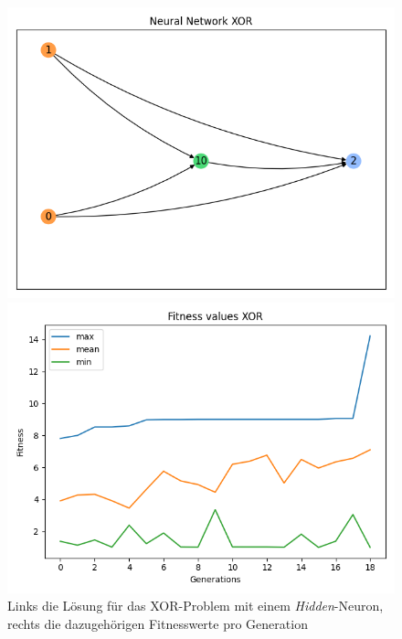 \begin{figure}[!h]
	\centering
	\begin{minipage}[b]{0.49\textwidth}
		\includegraphics[width=1.0\textwidth]{./img/xor_single_core/xor_neural_network.png} 
	\end{minipage}
	\hfill
	\begin{minipage}[b]{0.49\textwidth}
		\includegraphics[width=1.0\textwidth]{./img/xor_single_core/xor_fitness_.png} 
	\end{minipage}
	\caption{Links die Lösung für das XOR-Problem mit einem \emph{Hidden}-Neuron, rechts die dazugehörigen Fitnesswerte pro Generation}
	\label{fig:xor_solution_minimal}
\end{figure}
